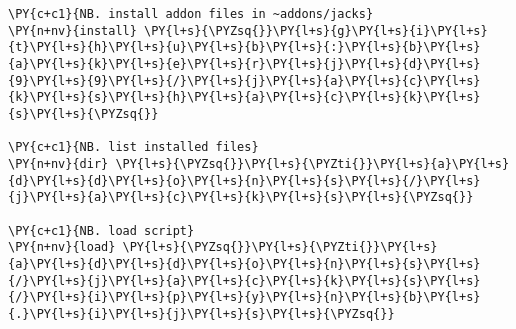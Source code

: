 \begin{tcolorbox}[breakable, size=fbox, boxrule=1pt, pad at break*=1mm,colback=cellbackground, colframe=cellborder]
\begin{Verbatim}[commandchars=\\\{\}]
\PY{c+c1}{NB. install addon files in ~addons/jacks}
\PY{n+nv}{install} \PY{l+s}{\PYZsq{}}\PY{l+s}{g}\PY{l+s}{i}\PY{l+s}{t}\PY{l+s}{h}\PY{l+s}{u}\PY{l+s}{b}\PY{l+s}{:}\PY{l+s}{b}\PY{l+s}{a}\PY{l+s}{k}\PY{l+s}{e}\PY{l+s}{r}\PY{l+s}{j}\PY{l+s}{d}\PY{l+s}{9}\PY{l+s}{9}\PY{l+s}{/}\PY{l+s}{j}\PY{l+s}{a}\PY{l+s}{c}\PY{l+s}{k}\PY{l+s}{s}\PY{l+s}{h}\PY{l+s}{a}\PY{l+s}{c}\PY{l+s}{k}\PY{l+s}{s}\PY{l+s}{\PYZsq{}}

\PY{c+c1}{NB. list installed files}
\PY{n+nv}{dir} \PY{l+s}{\PYZsq{}}\PY{l+s}{\PYZti{}}\PY{l+s}{a}\PY{l+s}{d}\PY{l+s}{d}\PY{l+s}{o}\PY{l+s}{n}\PY{l+s}{s}\PY{l+s}{/}\PY{l+s}{j}\PY{l+s}{a}\PY{l+s}{c}\PY{l+s}{k}\PY{l+s}{s}\PY{l+s}{\PYZsq{}}

\PY{c+c1}{NB. load script}
\PY{n+nv}{load} \PY{l+s}{\PYZsq{}}\PY{l+s}{\PYZti{}}\PY{l+s}{a}\PY{l+s}{d}\PY{l+s}{d}\PY{l+s}{o}\PY{l+s}{n}\PY{l+s}{s}\PY{l+s}{/}\PY{l+s}{j}\PY{l+s}{a}\PY{l+s}{c}\PY{l+s}{k}\PY{l+s}{s}\PY{l+s}{/}\PY{l+s}{i}\PY{l+s}{p}\PY{l+s}{y}\PY{l+s}{n}\PY{l+s}{b}\PY{l+s}{.}\PY{l+s}{i}\PY{l+s}{j}\PY{l+s}{s}\PY{l+s}{\PYZsq{}}
\end{Verbatim}
\end{tcolorbox}


%


%

